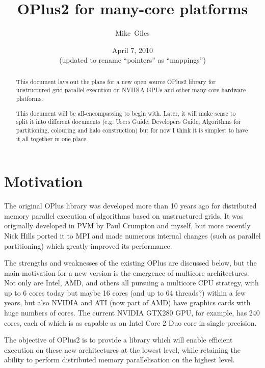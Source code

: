 \documentclass[12pt]{article}
\begin{document}
\title{OPlus2 for many-core platforms}
\author{Mike~Giles}
\date{April 7, 2010\\[0.1in] (updated to rename ``pointers'' as ``mappings'')}

\maketitle

\begin{abstract}
This document lays out the plans for a new open source OPlus2 
library for unstructured grid parallel execution on NVIDIA GPUs
and other many-core hardware platforms.

This document will be all-encompassing to begin with.  Later, 
it will make sense to split it into different documents 
(e.g. Users Guide; Developers Guide; Algorithms for 
partitioning, colouring and halo construction) but for now 
I think it is simplest to have it all together in one place.
\end{abstract}


\section{Motivation}

The original OPlus library was developed more than 10 years ago
for distributed memory parallel execution of algorithms based
on unstructured grids. It was originally developed in PVM by
Paul Crumpton and myself, but more recently Nick Hills ported
it to MPI and made numerous internal changes (such as parallel
partitioning) which greatly improved its performance.

The strengths and weaknesses of the existing OPlus are discussed 
below, but the main motivation for a new version is the emergence 
of multicore architectures.  Not only are Intel, AMD, and others
all pursuing a multicore CPU strategy, with up to 6 cores today 
but maybe 16 cores (and up to 64 threads?) within a few years, 
but also NVIDIA and ATI (now part of AMD) have graphics cards 
with huge numbers of cores.  The current NVIDIA GTX280 GPU, 
for example, has 240 cores, each of which is as capable as an 
Intel Core 2 Duo core in single precision.

The objective of OPlus2 is to provide a library which will enable
efficient execution on these new architectures at the lowest 
level, while retaining the ability to perform distributed memory 
parallelisation on the highest level.


\newpage
\end{document}
